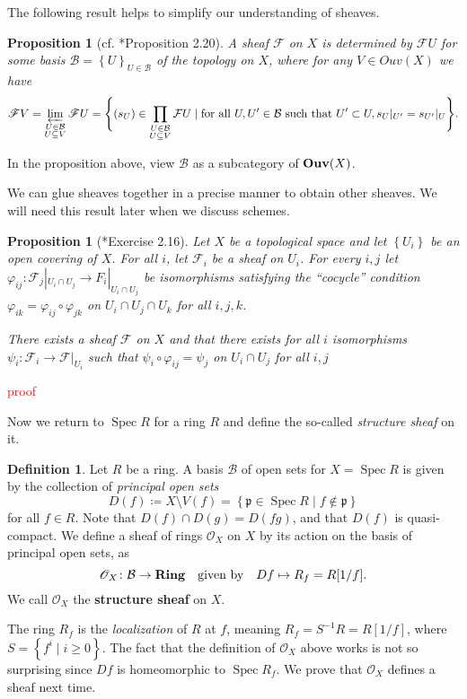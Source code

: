 \documentclass[11pt,leqno]{article}
\newcommand{\sai}[1]{\textcolor{red}{#1}}
\theoremstyle{plain}
\newtheorem{proposition}[lem]{Proposition}
\theoremstyle{definition}
\newtheorem{definition/}[lem]{Definition}
\newenvironment{definition}
  {\renewcommand{\qedsymbol}{\textdagger}%
   \pushQED{\qed}\begin{definition/}}
  {\popQED\end{definition/}}
\numberwithin{equation}{section}
\numberwithin{lem}{section}
\newcommand{\cbr}[1]{\left\{#1\right\}}
\newcommand{\bidx}[1]{\textbf{#1\index{#1}}} %
\DeclareMathOperator{\Spec}{Spec}
\newcommand{\catname}[1]{{\normalfont\mathbf{#1}}}
\newcommand{\Ring}{\catname{Ring}}
\newcommand{\Ouv}{\catname{Ouv}}
\begin{document}
The following result helps to simplify our understanding of sheaves.
\begin{proposition}[cf. \cite{gw}*{Proposition 2.20}]
    A sheaf $\mathscr F$ on $X$ is determined by $\mathscr FU$ for some basis $\mathcal B = \cbr{U}_{U\in\mathcal B}$ of the topology on $X$, where for any $V\in Ouv(X)$ we have 
    \begin{equation}
        \mathscr FV = \varprojlim_{\substack{U\in \mathcal B\\U\subseteq V}}\mathscr FU = \Bigg\{(s_U)\in \prod_{\substack{U\in \mathcal B\\U\subseteq V}}\mathcal FU\mid \text{for all }U,U^\prime\in\mathcal B \text{ such that } U^\prime\subset U, s_U|_{U^\prime} = s_{U^\prime}|_U\Bigg\}.
    \end{equation}
\end{proposition}
In the proposition above, view $\mathcal B$ as a subcategory of $\Ouv(X)$.

We can glue sheaves together in a precise manner to obtain other sheaves. We will need this result later when we discuss schemes.
\begin{proposition}[\cite{gw}*{Exercise 2.16}]
    Let $X$ be a topological space and let $\cbr{U_i}$ be an open covering of $X$. For all $i$, let $\mathscr F_i$ be a sheaf on $U_i$. For every $i,j$ let $\varphi_{ij}\colon \mathscr F_j|_{U_i\cap U_j}\to F_i|_{U_i\cap U_j}$ be isomorphisms satisfying the ``cocycle'' condition $\varphi_{ik} = \varphi_{ij}\circ\varphi_{jk}$ on $U_i\cap U_j\cap U_k$ for all $i,j,k$.

    There exists a sheaf $\mathscr F$ on $X$ and that there exists for all $i$ isomorphisms $\psi_i\colon \mathcal F_i \to \mathscr F|_{U_i}$ such that $\psi_i \circ \varphi_{ij} = \psi_j$ on $U_i\cap U_j$ for all $i,j$
\end{proposition}
\sai{proof}

Now we return to $\Spec R$ for a ring $R$ and define the so-called \textit{structure sheaf} on it.
\begin{definition}
    Let $R$ be a ring. A basis $\mathcal B$ of open sets for $X=\Spec R$ is given by the collection of \textit{principal open sets} 
    \begin{equation}
        D(f) \coloneqq X\setminus V(f) = \cbr{\mathfrak p\in\Spec R\mid f\not\in \mathfrak p}
    \end{equation}
    for all $f\in R$. Note that $D(f)\cap D(g) = D(fg)$, and that $D(f)$ is quasi-compact.
    We define a sheaf of rings \bidx{$\mathscr O_X$} on $X$ by its action on the basis of principal open sets, as
    \begin{equation}
        \mathscr O_X\colon \mathcal B\to \Ring \quad\text{given by}\quad Df\mapsto R_f = R[1/f].
    \end{equation}
    We call $\mathscr O_X$ the \bidx{structure sheaf} on $X$.
\end{definition}
The ring $R_f$ is the \textit{localization} of $R$ at $f$, meaning $R_f = S^{-1}R = R[1/f]$, where $S = \cbr{f^i\mid i\geq 0}$. The fact that the definition of $\mathscr O_X$ above works is not so surprising since $Df$ is homeomorphic to $\Spec R_f$. We prove that $\mathscr O_X$ defines a sheaf next time.
\end{document}
